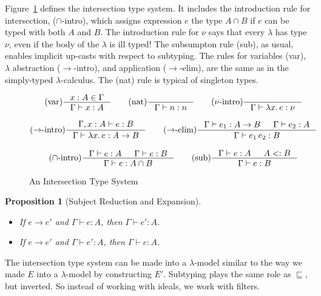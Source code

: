 \documentclass{tufte-handout}
\newcommand{\LAM}[1]{\lambda #1.\,}
\newcommand{\APP}[0]{\,}
\newtheorem{proposition}[theorem]{Proposition}
\begin{document}
Figure~\ref{fig:intersect-type-system} defines the intersection type
system.  It includes the introduction rule for intersection,
($\cap$-intro), which assigns expression $e$ the type $A \cap B$ if
$e$ can be typed with both $A$ and $B$.  The introduction rule for
$\nu$ says that every $\lambda$ has type $\nu$, even if the body of
the $\lambda$ is ill typed!  The subsumpton rule (sub), as usual,
enables implicit up-casts with respect to subtyping.  The rules for
variables (var), $\lambda$ abstraction ($\to$-intro), and application
($\to$-elim), are the same as in the simply-typed $\lambda$-calculus.
The (nat) rule is typical of singleton types.

\begin{figure}
\begin{gather*}
\text{(var)}
\inference{x:A \in \Gamma}
          {\Gamma \vdash x : A}
\qquad
\text{(nat)}
\inference{}{\Gamma \vdash n : n}
\qquad
\text{($\nu$-intro)}
\inference{}
          {\Gamma \vdash \LAM{x} e : \nu}
\\[2ex]
\text{($\to$-intro)}
\inference{\Gamma,x:A \vdash e : B}
          {\Gamma \vdash \LAM{x} e : A \to B}
\qquad
\text{($\to$-elim)}
\inference{\Gamma \vdash e_1 : A \to B & \Gamma \vdash e_2 : A}
          {\Gamma \vdash e_1 \APP e_2 : B}
\\[2ex]
\text{($\cap$-intro)}
\inference{\Gamma \vdash e : A & \Gamma \vdash e : B}
          {\Gamma \vdash e : A \cap B}
\qquad
\text{(sub)}
\inference{\Gamma \vdash e : A & A <: B}
          {\Gamma \vdash e : B}
\end{gather*}

\caption{An Intersection Type System}
\label{fig:intersect-type-system}
\end{figure}


\begin{proposition}[Subject Reduction and Expansion]\ 
  \begin{itemize}
  \item If $e \longrightarrow e'$ and $\Gamma \vdash e : A$,
    then $\Gamma \vdash e' : A$.
  \item If $e \longrightarrow e'$ and $\Gamma \vdash e' : A$,
    then $\Gamma \vdash e : A$.
  \end{itemize}
\end{proposition}


The intersection type system can be made into a $\lambda$-model
similar to the way we made $E$ into a $\lambda$-model by constructing
$E'$. Subtyping plays the same role as $\sqsubseteq$, but inverted.
So instead of working with ideals, we work with filters.
\end{document}
